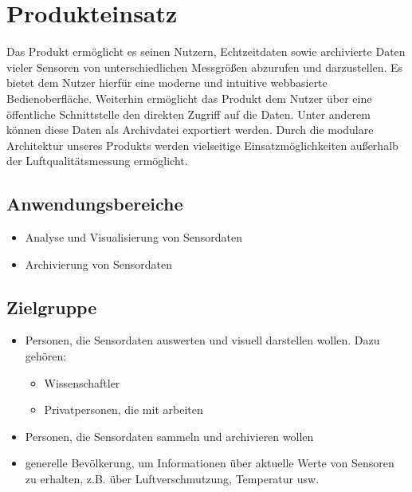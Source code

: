 \chapter{Produkteinsatz}
Das Produkt ermöglicht es seinen Nutzern, Echtzeitdaten sowie archivierte Daten vieler Sensoren von unterschiedlichen Messgrößen abzurufen und darzustellen. Es bietet dem Nutzer hierfür eine moderne und intuitive webbasierte Bedienoberfläche. Weiterhin ermöglicht das Produkt dem Nutzer über eine öffentliche Schnittstelle den direkten Zugriff auf die Daten. Unter anderem können diese Daten als Archivdatei exportiert werden. Durch die modulare Architektur unseres Produkts werden vielseitige Einsatzmöglichkeiten außerhalb der Luftqualitätsmessung ermöglicht.
\section{Anwendungsbereiche}
\begin{itemize}
	\item Analyse und Visualisierung von Sensordaten
	\item Archivierung von Sensordaten
\end{itemize}
\section{Zielgruppe}
\begin{itemize}
	\item Personen, die Sensordaten auswerten und visuell darstellen wollen. Dazu gehören:
	\begin{itemize}
		\item Wissenschaftler
		\item Privatpersonen, die mit  arbeiten
	\end{itemize}
	\item Personen, die Sensordaten sammeln und archivieren wollen
	\item generelle Bevölkerung, um Informationen über aktuelle Werte von Sensoren zu erhalten, z.B. über Luftverschmutzung, Temperatur usw.
\end{itemize}
